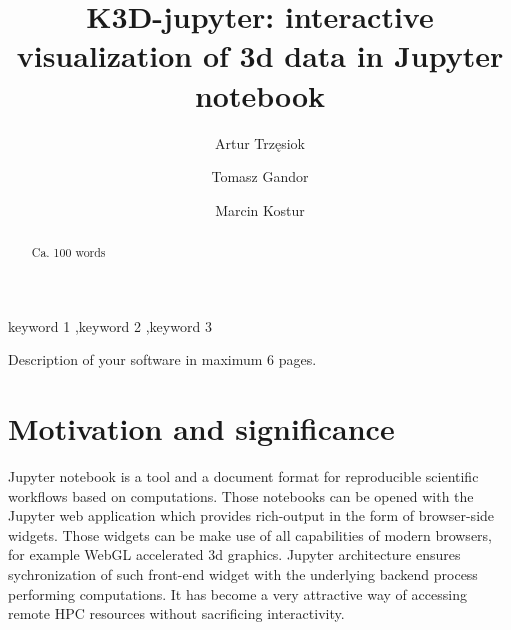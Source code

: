 \documentclass[preprint,12pt, a4paper]{elsarticle}
\begin{document}
\begin{frontmatter}

\title{K3D-jupyter: interactive visualization of 3d data in Jupyter notebook}


\author[cube]{Artur Trzęsiok}
\author[fp]{Tomasz Gandor}
\author[sil]{Marcin Kostur}

\address[cube]{Cubeproject}
\address[sil]{Institute of Physics, University of Silesia, 41-500 Chorzów, Poland}
\address[fp]{Future Processing, 44-100 Gliwice, Poland}
\begin{abstract}
Ca. 100 words

\end{abstract}

\begin{keyword}
keyword 1 \sep keyword 2 \sep keyword 3



\end{keyword}

\end{frontmatter}

\linenumbers


Description of your software in maximum 6 pages.

\section{Motivation and significance}
\label{}

Jupyter notebook is a tool and a document format for reproducible
scientific workflows based on computations. Those notebooks can be
opened with the Jupyter web application which provides rich-output in
the form of browser-side widgets. Those widgets can be make use of all
capabilities of modern browsers, for example WebGL accelerated 3d
graphics. Jupyter architecture ensures sychronization of such
front-end widget with the underlying backend process performing
computations. It has become a very attractive way of accessing
remote HPC resources without sacrificing interactivity. 
\end{document}
